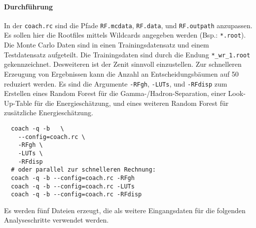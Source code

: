 \paragraph{Durchführung}%
In der \texttt{coach.rc} sind die Pfade
\texttt{RF.mcdata},
\texttt{RF.data},
und \texttt{RF.outpath}
anzupassen.
Es sollen hier die Rootfiles mittels Wildcards angegeben werden
(Bsp.: \texttt{*.root}).
Die Monte Carlo Daten sind in einen Trainingsdatensatz
und einem Testdatensatz aufgeteilt.
Die Trainingsdaten sind durch die Endung
\texttt{*\_wr\_1.root} gekennzeichnet.
Desweiteren ist der Zenit sinnvoll einzustellen.
Zur schnelleren Erzeugung von Ergebnissen kann die Anzahl an
Entscheidungsbäumen auf \num{50}
reduziert werden.
Es sind die Argumente
\texttt{-RFgh}, \texttt{-LUTs}, und \texttt{-RFdisp}
zum Erstellen eines Random Forest für die Gamma-/Hadron-Separation,
einer Look-Up-Table für die Energieschätzung,
und eines weiteren Random Forest für zusätzliche Energieschätzung.

\begin{lstlisting}
  coach -q -b	\
    --config=coach.rc \
    -RFgh \
    -LUTs \
    -RFdisp
  # oder parallel zur schnelleren Rechnung:
  coach -q -b --config=coach.rc -RFgh
  coach -q -b --config=coach.rc -LUTs
  coach -q -b --config=coach.rc -RFdisp
\end{lstlisting}

Es werden fünf Dateien erzeugt,
die als weitere Eingangsdaten für die folgenden Analyseschritte verwendet
werden.
